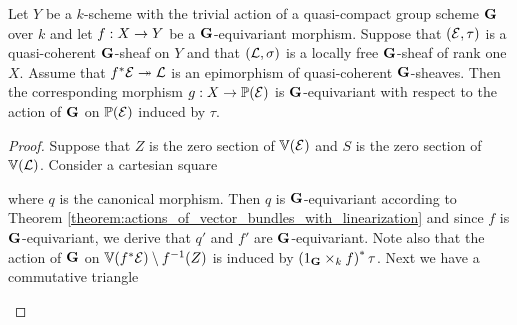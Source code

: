 \begin{corollary}\label{corollary:universal_property_of_projective_bundles_and_equivariance}
Let $Y$ be a $k$-scheme with the trivial action of a quasi-compact group scheme $\mathbf{G}$ over $k$ and let $f:X\rightarrow Y$ be a $\mathbf{G}$-equivariant morphism. Suppose that $({\mathcal E},\tau)$ is a quasi-coherent $\mathbf{G}$-sheaf on $Y$ and that $({\mathcal L},\sigma)$ is a locally free $\mathbf{G}$-sheaf of rank one $X$. Assume that $f^*{\mathcal E}\twoheadrightarrow {\mathcal L}$ is an epimorphism of quasi-coherent $\mathbf{G}$-sheaves.  Then the corresponding morphism $g:X\rightarrow \mathbb{P}({\mathcal E})$ is $\mathbf{G}$-equivariant with respect to the action of $\mathbf{G}$ on $\mathbb{P}({\mathcal E})$ induced by $\tau$.
\end{corollary}
\begin{proof}
Suppose that $Z$ is the zero section of $\mathbb{V}({\mathcal E})$ and $S$ is the zero section of $\mathbb{V}({\mathcal L})$. Consider a cartesian square
\begin{center}
\end{center}
where $q$ is the canonical morphism. Then $q$ is $\mathbf{G}$-equivariant according to Theorem \ref{theorem:actions_of_vector_bundles_with_linearization} and since $f$ is $\mathbf{G}$-equivariant, we derive that $q'$ and $f'$ are $\mathbf{G}$-equivariant. Note also that the action of $\mathbf{G}$ on $\mathbb{V}(f^*{\mathcal E})\setminus f^{-1}(Z)$ is induced by $\left(1_{\mathbf{G}}\times_kf\right)^*\tau$. Next we have a commutative triangle
\begin{center}
\end{center}
\end{proof}
